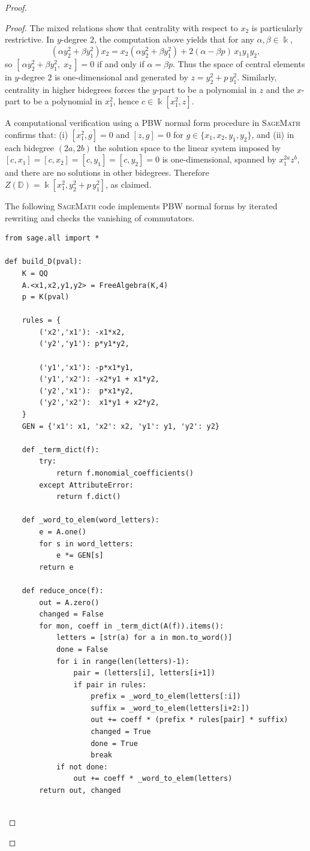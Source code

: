 \documentclass{amsart}
\theoremstyle{definition}
\theoremstyle{remark}
\numberwithin{equation}{section}
\begin{document}
\begin{proof}
\begin{proof}
The mixed relations show that centrality with respect to \(x_2\) is particularly restrictive.
In \(y\)-degree \(2\), the computation above yields that for any \(\alpha,\beta\in\Bbbk\),
\[
(\alpha y_2^2+\beta y_1^2)x_2
=
x_2(\alpha y_2^2+\beta y_1^2)+2(\alpha-\beta p)\,x_1y_1y_2,
\]
so \([\,\alpha y_2^2+\beta y_1^2,\;x_2\,]=0\) if and only if \(\alpha=\beta p\).
Thus the space of central elements in \(y\)-degree \(2\) is one-dimensional and generated by \(z=y_2^2+p\,y_1^2\).
Similarly, centrality in higher bidegrees forces the \(y\)-part to be a polynomial in \(z\) and the \(x\)-part to be a polynomial in \(x_1^2\),
hence \(c\in\Bbbk[x_1^2,z]\).

A computational verification using a PBW normal form procedure in \textsc{SageMath} confirms that:
(i) \([x_1^2,g]=0\) and \([z,g]=0\) for \(g\in\{x_1,x_2,y_1,y_2\}\), and
(ii) in each bidegree \((2a,2b)\) the solution space to the linear system imposed by \([c,x_1]=[c,x_2]=[c,y_1]=[c,y_2]=0\)
is one-dimensional, spanned by \(x_1^{2a}z^b\), and there are no solutions in other bidegrees.
Therefore \(Z(\mathbb{D})=\Bbbk[x_1^2,y_2^2+p\,y_1^2]\), as claimed.

The following \textsc{SageMath} code implements PBW normal forms by iterated rewriting and checks the vanishing of commutators.
\begin{verbatim}
from sage.all import *

def build_D(pval):
    K = QQ
    A.<x1,x2,y1,y2> = FreeAlgebra(K,4)
    p = K(pval)

    rules = {
        ('x2','x1'): -x1*x2,
        ('y2','y1'): p*y1*y2,

        ('y1','x1'): -p*x1*y1,
        ('y1','x2'): -x2*y1 + x1*y2,
        ('y2','x1'):  p*x1*y2,
        ('y2','x2'):  x1*y1 + x2*y2,
    }
    GEN = {'x1': x1, 'x2': x2, 'y1': y1, 'y2': y2}

    def _term_dict(f):
        try:
            return f.monomial_coefficients()
        except AttributeError:
            return f.dict()

    def _word_to_elem(word_letters):
        e = A.one()
        for s in word_letters:
            e *= GEN[s]
        return e

    def reduce_once(f):
        out = A.zero()
        changed = False
        for mon, coeff in _term_dict(A(f)).items():
            letters = [str(a) for a in mon.to_word()]
            done = False
            for i in range(len(letters)-1):
                pair = (letters[i], letters[i+1])
                if pair in rules:
                    prefix = _word_to_elem(letters[:i])
                    suffix = _word_to_elem(letters[i+2:])
                    out += coeff * (prefix * rules[pair] * suffix)
                    changed = True
                    done = True
                    break
            if not done:
                out += coeff * _word_to_elem(letters)
        return out, changed


\end{verbatim}
\end{proof}
\end{proof}
\end{document}
